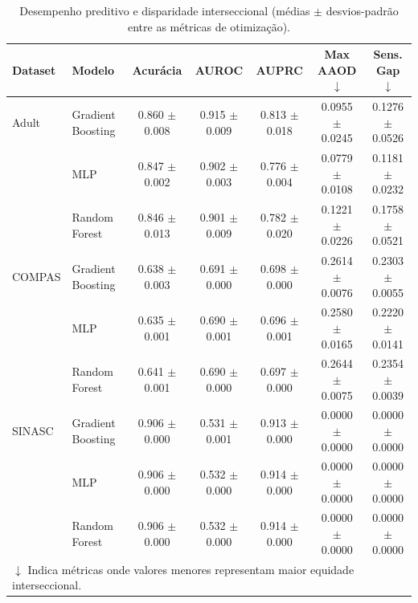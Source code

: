 \begin{table}[htbp]
\centering
\small
\caption{Desempenho preditivo e disparidade interseccional (médias $\pm$ desvios-padrão entre as métricas de otimização).}
\label{tab:modelos_resumo}
\begin{tabular}{llccccc}
\toprule
\textbf{Dataset} & \textbf{Modelo} & \textbf{Acurácia} & \textbf{AUROC} & \textbf{AUPRC} & \textbf{Max AAOD} $\downarrow$ & \textbf{Sens. Gap} $\downarrow$ \\
\midrule
Adult & Gradient Boosting & 0.860 $\pm$ 0.008 & 0.915 $\pm$ 0.009 & 0.813 $\pm$ 0.018 & 0.0955 $\pm$ 0.0245 & 0.1276 $\pm$ 0.0526 \\
 & MLP & 0.847 $\pm$ 0.002 & 0.902 $\pm$ 0.003 & 0.776 $\pm$ 0.004 & 0.0779 $\pm$ 0.0108 & 0.1181 $\pm$ 0.0232 \\
 & Random Forest & 0.846 $\pm$ 0.013 & 0.901 $\pm$ 0.009 & 0.782 $\pm$ 0.020 & 0.1221 $\pm$ 0.0226 & 0.1758 $\pm$ 0.0521 \\
\midrule
COMPAS & Gradient Boosting & 0.638 $\pm$ 0.003 & 0.691 $\pm$ 0.000 & 0.698 $\pm$ 0.000 & 0.2614 $\pm$ 0.0076 & 0.2303 $\pm$ 0.0055 \\
 & MLP & 0.635 $\pm$ 0.001 & 0.690 $\pm$ 0.001 & 0.696 $\pm$ 0.001 & 0.2580 $\pm$ 0.0165 & 0.2220 $\pm$ 0.0141 \\
 & Random Forest & 0.641 $\pm$ 0.001 & 0.690 $\pm$ 0.000 & 0.697 $\pm$ 0.000 & 0.2644 $\pm$ 0.0075 & 0.2354 $\pm$ 0.0039 \\
\midrule
SINASC & Gradient Boosting & 0.906 $\pm$ 0.000 & 0.531 $\pm$ 0.001 & 0.913 $\pm$ 0.000 & 0.0000 $\pm$ 0.0000 & 0.0000 $\pm$ 0.0000 \\
 & MLP & 0.906 $\pm$ 0.000 & 0.532 $\pm$ 0.000 & 0.914 $\pm$ 0.000 & 0.0000 $\pm$ 0.0000 & 0.0000 $\pm$ 0.0000 \\
 & Random Forest & 0.906 $\pm$ 0.000 & 0.532 $\pm$ 0.000 & 0.914 $\pm$ 0.000 & 0.0000 $\pm$ 0.0000 & 0.0000 $\pm$ 0.0000 \\
\bottomrule
\multicolumn{7}{l}{\footnotesize $\downarrow$ Indica métricas onde valores menores representam maior equidade interseccional.} \\
\end{tabular}
\end{table}